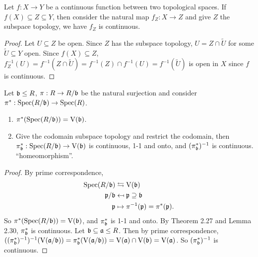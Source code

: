 \begin{lemma}
    Let $f: X \to Y$ be a continuous function between two topological spaces. If $f(X) \subseteq Z \subseteq Y$, then consider the natural map $f_Z: X \to Z$ and give $Z$ the subspace topology, we have $f_Z$ is continuous.
\end{lemma}

\begin{proof}
    Let $U \subseteq Z$ be open. Since $Z$ has the subspace topology, $U = Z \cap \widetilde U$ for some $\widetilde U \subseteq Y$ open. Since $f(X) \subseteq Z$, $f_Z^{-1}(U) = f^{-1}(Z \cap \widetilde U) = f^{-1}(Z) \cap f^{-1}(U) = f^{-1}(\widetilde U)$ is open in $X$ since $f$ is continuous.
\end{proof}

\begin{theorem}
    Let $\mathfrak{b} \leq R$, $\pi: R \to R/\mathfrak{b}$ be the natural surjection and consider $\pi^*: \operatorname{Spec}(R/\mathfrak{b}) \to \operatorname{Spec}(R)$.
    \begin{enumerate}
        \item $\pi^*(\operatorname{Spec}(R/\mathfrak{b})) = \operatorname{V}(\mathfrak{b})$.
        \item Give the codomain subspace topology and restrict the codomain, then $\pi_{\mathfrak{b}}^*: \operatorname{Spec}(R/\mathfrak{b}) \to \operatorname{V}(\mathfrak{b})$ is continuous, 1-1 and onto, and $(\pi_{\mathfrak{b}}^*)^{-1}$ is continuous. ``homeomorphism''.
    \end{enumerate}
\end{theorem}

\begin{proof}
    By prime correspondence, 
    \begin{align*}
        \operatorname{Spec}(R/\mathfrak{b}) &\leftrightarrows \operatorname{V}(\mathfrak{b}) \\
        \mathfrak{p}/\mathfrak{b} &\mapsfrom \mathfrak{p} \supseteq \mathfrak{b} \\
        \mathfrak{p} &\mapsto \pi^{-1}(\mathfrak{p}) = \pi^*(\mathfrak{p}).
    \end{align*}
    So $\pi^*(\operatorname{Spec}(R/\mathfrak{b})) = \operatorname{V}(\mathfrak{b})$, and $\pi_{\mathfrak{b}}^*$ is 1-1 and onto. By Theorem 2.27 and Lemma 2.30, $\pi_{\mathfrak{b}}^*$ is continuous. Let $\mathfrak{b} \subseteq \mathfrak{a} \leq R$. Then by prime correspondence, $((\pi_{\mathfrak{b}}^*)^{-1})^{-1}(\operatorname{V}(\mathfrak{a}/\mathfrak{b})) = \pi_{\mathfrak{b}}^*(\operatorname{V}(\mathfrak{a}/\mathfrak{b})) = \operatorname{V}(\mathfrak{a}) \cap \operatorname{V}(\mathfrak{b}) = \operatorname{V}(\mathfrak{a})$. So $(\pi_{\mathfrak{b}}^*)^{-1}$ is continuous.
\end{proof}

